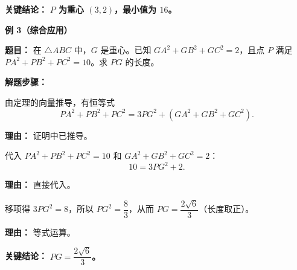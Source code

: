 \begin{examplebox}
	\textbf{\textcolor{CExample}{关键结论：}}
	\textbf{$P$ 为重心 $(3,2)$，最小值为 $16$。}

	\medskip
	\textbf{\textcolor{CExample}{例 3（综合应用）}}

	\textbf{\textcolor{CExample}{题目：}}
	在 $\triangle ABC$ 中，$G$ 是重心。已知 $GA^2+GB^2+GC^2 = 2$，且点 $P$ 满足 $PA^2+PB^2+PC^2 = 10$。求 $PG$ 的长度。

	\textbf{\textcolor{CExample}{解题步骤：}}
	\begin{description}[style=nextline, leftmargin=2.8em, labelsep=0.5em, itemsep=0.45em]
		\item[\textbf{第一步（引入恒等式）：}] 由定理的向量推导，有恒等式
			\[
				PA^2+PB^2+PC^2 = 3PG^2 + (GA^2+GB^2+GC^2).
			\]
			\par\textbf{理由：} 证明中已推导。
		\item[\textbf{第二步（代入已知数据）：}] 代入 $PA^2+PB^2+PC^2=10$ 和 $GA^2+GB^2+GC^2=2$：
			\[
				10 = 3PG^2 + 2.
			\]
			\par\textbf{理由：} 直接代入。
		\item[\textbf{第三步（解出 $PG$）：}] 移项得 $3PG^2 = 8$，所以 $PG^2 = \dfrac{8}{3}$，从而 $PG = \dfrac{2\sqrt{6}}{3}$（长度取正）。
			\par\textbf{理由：} 等式运算。
	\end{description}

	\textbf{\textcolor{CExample}{关键结论：}}
	\textbf{$PG = \dfrac{2\sqrt{6}}{3}$。}
\end{examplebox}
